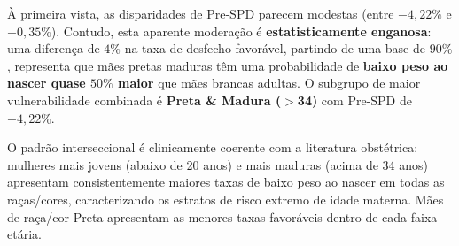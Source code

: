 \begin{table}[H]
    \centering
    \caption{Seleção de disparidades de paridade estatística pré-treino por subgrupo (SINASC). Referência: Branca \& Adulta (20-34).}
    \vspace{2mm}
    \label{tab:sinasc_pretrain}
\end{table}

À primeira vista, as disparidades de Pre-SPD parecem modestas (entre $-4,22\%$ e $+0,35\%$). Contudo, esta aparente moderação é \textbf{estatisticamente enganosa}: uma diferença de $4\%$ na taxa de desfecho favorável, partindo de uma base de $90\%$, representa que mães pretas maduras têm uma probabilidade de \textbf{baixo peso ao nascer quase $50\%$ maior} que mães brancas adultas. O subgrupo de maior vulnerabilidade combinada é \textbf{Preta \& Madura ($>$34)} com Pre-SPD de $-4,22\%$.

O padrão interseccional é clinicamente coerente com a literatura obstétrica: mulheres mais jovens (abaixo de 20 anos) e mais maduras (acima de 34 anos) apresentam consistentemente maiores taxas de baixo peso ao nascer em todas as raças/cores, caracterizando os estratos de risco extremo de idade materna. Mães de raça/cor Preta apresentam as menores taxas favoráveis dentro de cada faixa etária.

